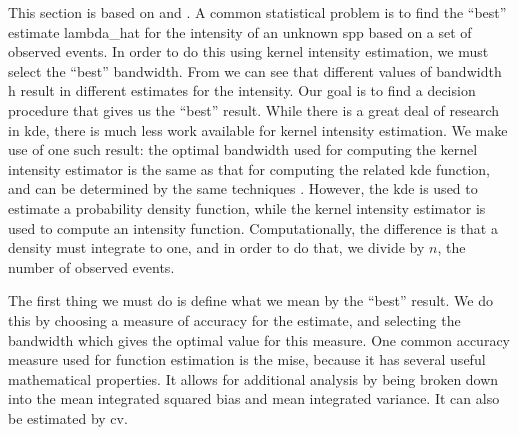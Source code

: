 This section is based on \citet{silverman1986density} and \citet{wand1994kernel}.
A common statistical problem is to find the ``best'' estimate \gls{lambda_hat}
for the \gls{intensity} of an unknown \gls{spp}
based on a set of observed \glspl{event}.
In order to do this using \gls{kernel intensity estimation},
we must select the ``best'' bandwidth.
From  we can see that different values of bandwidth \gls{h} result in different estimates for the \gls{intensity}.
Our goal is to find a decision procedure that gives us the ``best'' result.
While there is a great deal of research in \gls{kde},
there is much less work available for \gls{kernel intensity estimation}.
We make use of one such result:
the optimal bandwidth used for computing the \gls{kernel intensity estimator} is the same as that for computing the related \gls{kde} function,
and can be determined by the same techniques .
However, the \gls{kde} is used to estimate a probability density function,
while the \gls{kernel intensity estimator} is used to compute an intensity function.
Computationally, the difference is that a density must integrate to one,
and in order to do that,
we divide by $n$,
the number of observed events.


The first thing we must do is define what we mean by the ``best'' result.
We do this by choosing a measure of accuracy for the estimate,
and selecting the bandwidth which gives the optimal value for this measure.
One common accuracy measure used for function estimation is the \gls{mise},
because it has several useful mathematical properties.
It allows for additional analysis by being broken down into the mean integrated squared bias and mean integrated variance.
It can also be estimated by \acrlong{cv}.

